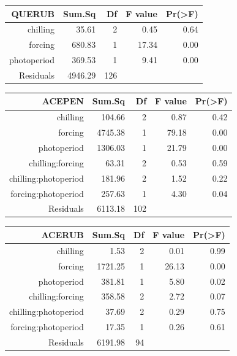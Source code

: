 \documentclass{article}\usepackage[]{graphicx}\usepackage[]{color}
\begin{document}
\begin{table}[ht]
\centering
\begin{tabular}{rrrrr}
  \hline
  QUERUB & Sum.Sq & Df & F value & Pr(>F) \\
 \hline
chilling & 35.61 &   2 & 0.45 & 0.64 \\ 
  forcing & 680.83 &   1 & 17.34 & 0.00 \\ 
  photoperiod & 369.53 &   1 & 9.41 & 0.00 \\ 
  Residuals & 4946.29 & 126 &  &  \\ 
   \hline
\end{tabular}
\end{table}


\begin{table}[ht]
\centering
\begin{tabular}{rrrrr}
  \hline
  ACEPEN & Sum.Sq & Df & F value & Pr(>F) \\
 \hline
chilling & 104.66 &   2 & 0.87 & 0.42 \\ 
  forcing & 4745.38 &   1 & 79.18 & 0.00 \\ 
  photoperiod & 1306.03 &   1 & 21.79 & 0.00 \\ 
  chilling:forcing & 63.31 &   2 & 0.53 & 0.59 \\ 
  chilling:photoperiod & 181.96 &   2 & 1.52 & 0.22 \\ 
  forcing:photoperiod & 257.63 &   1 & 4.30 & 0.04 \\ 
  Residuals & 6113.18 & 102 &  &  \\ 
   \hline
\end{tabular}
\end{table}
\begin{table}[ht]
\centering
\begin{tabular}{rrrrr}
  \hline
  ACERUB & Sum.Sq & Df & F value & Pr(>F) \\
 \hline
chilling & 1.53 &   2 & 0.01 & 0.99 \\ 
  forcing & 1721.25 &   1 & 26.13 & 0.00 \\ 
  photoperiod & 381.81 &   1 & 5.80 & 0.02 \\ 
  chilling:forcing & 358.58 &   2 & 2.72 & 0.07 \\ 
  chilling:photoperiod & 37.69 &   2 & 0.29 & 0.75 \\ 
  forcing:photoperiod & 17.35 &   1 & 0.26 & 0.61 \\ 
  Residuals & 6191.98 &  94 &  &  \\ 
   \hline
\end{tabular}
\end{table}
\end{document}
